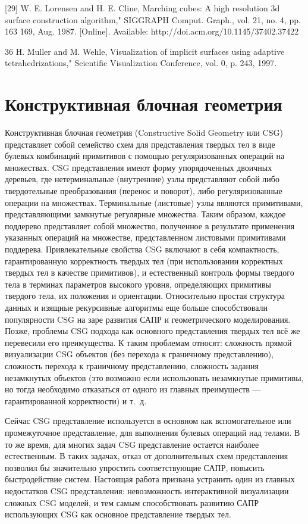 [29] W. E. Lorensen and H. E. Cline, Marching cubes: A high resolution 3d surface
construction algorithm," SIGGRAPH Comput. Graph., vol. 21, no. 4, pp. 163
169, Aug. 1987. [Online]. Available: http://doi.acm.org/10.1145/37402.37422

36 H. Muller and M. Wehle, Visualization of implicit surfaces using adaptive tetrahedrizations," Scientific Visualization Conference, vol. 0, p. 243, 1997.

\section{Конструктивная блочная геометрия} \label{sect_csg}

Конструктивная блочная геометрия (Constructive Solid Geometry или CSG) представляет собой семейство схем для представления твердых тел в виде булевых комбинаций примитивов с помощью регуляризованных \cite{Requicha80} \cite{Requicha77} операций на множествах. CSG представления имеют форму упорядоченных двоичных деревьев, где нетерминальные (внутренние) узлы представляют собой либо твердотельные преобразования (перенос и поворот), либо регуляризованные операции на множествах. Терминальные (листовые) узлы являются примитивами, представляющими замкнутые регулярные множества. Таким образом, каждое поддерево представляет собой множество, полученное в результате применения указанных операций на множестве, представленном листовыми примитивами поддерева. Привлекательные свойства CSG включают в себя компактность, гарантированную корректность твердых тел (при использовании корректных твердых тел в качестве примитивов), и естественный контроль формы твердого тела в терминах параметров высокого уровня, определяющих примитивы твердого тела, их положения и ориентации. Относительно простая структура данных и изящные рекурсивные алгоритмы еще больше способствовали популярности CSG на заре развития САПР и геометрического моделирования. Позже, проблемы CSG подхода как основного представления твердых тел всё же перевесили его преимущества. К таким проблемам относят: сложность прямой визуализации CSG объектов (без перехода к граничному представлению), сложность перехода к граничному представлению, сложность задания незамкнутых объектов (это возможно если использовать незамкнутые примитивы, но тогда необходимо отказаться от одного из главных преимуществ — гарантированной корректности) и т. д.

Сейчас CSG представление используется в основном как вспомогательное или промежуточное представление, для выполнения булевых операций над телами. В то же время, для многих задач CSG представление остается наиболее естественным. В таких задачах, отказ от дополнительных схем представления позволил бы значительно упростить соответствующие САПР, повысить быстродействие систем. Настоящая работа призвана устранить один из главных недостатков CSG представления: невозможность интерактивной визуализации сложных CSG моделей, и тем самым способствовать развитию САПР использующих CSG как основное представление твердых тел.

